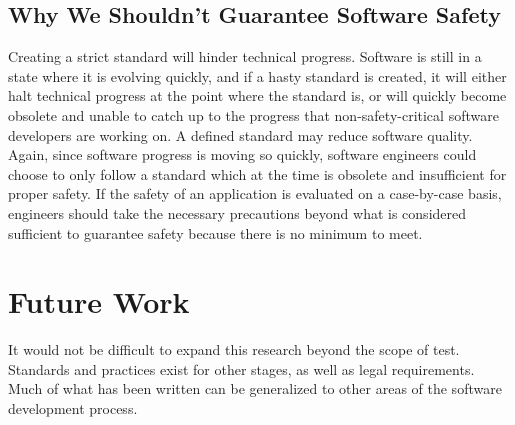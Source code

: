 \documentclass[12pt]{report}
\begin{document}
\subsection{Why We Shouldn't Guarantee Software Safety} 
Creating a strict standard will hinder technical progress. Software is still in a state where it is evolving quickly, and if a hasty standard is created, it will either halt technical progress at the point where the standard is, or will quickly become obsolete and unable to catch up to the progress that non-safety-critical software developers are working on. 
A defined standard may reduce software quality. Again, since software progress is moving so quickly, software engineers could choose to only follow a standard which at the time is obsolete and insufficient for proper safety. If the safety of an application is evaluated on a case-by-case basis, engineers should take the necessary precautions beyond what is considered sufficient to guarantee safety because there is no minimum to meet. 

\section{Future Work} 

It would not be difficult to expand this research beyond the scope of test. Standards and practices exist for other stages, as well as legal requirements. Much of what has been written can be generalized to other areas of the software development process. 

 
 
\end{document}
